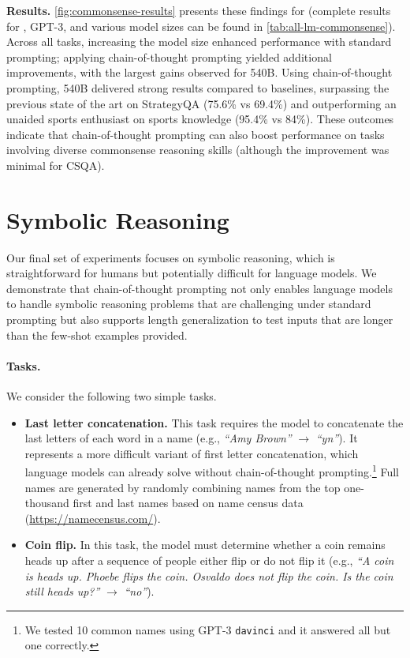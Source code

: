 \textbf{Results.}
\cref{fig:commonsense-results} presents these findings for \palm{} (complete results for \lamda{}, GPT-3, and various model sizes can be found in \cref{tab:all-lm-commonsense}).
Across all tasks, increasing the model size enhanced performance with standard prompting; applying chain-of-thought prompting yielded additional improvements, with the largest gains observed for \palm{} 540B. Using chain-of-thought prompting, \palm{} 540B delivered strong results compared to baselines, surpassing the previous state of the art on StrategyQA (75.6\% vs 69.4\%) and outperforming an unaided sports enthusiast on sports knowledge (95.4\% vs 84\%).
These outcomes indicate that chain-of-thought prompting can also boost performance on tasks involving diverse commonsense reasoning skills (although the improvement was minimal for CSQA).




\section{Symbolic Reasoning}\label{sec:symbolic-reasoning}
Our final set of experiments focuses on symbolic reasoning, which is straightforward for humans but potentially difficult for language models. We demonstrate that chain-of-thought prompting not only enables language models to handle symbolic reasoning problems that are challenging under standard prompting but also supports length generalization to test inputs that are longer than the few-shot examples provided.

\paragraph{Tasks.}
We consider the following two simple tasks.

\begin{itemize}[leftmargin=*,topsep=0pt]
    \itemsep0em \item \textbf{Last letter concatenation.} This task requires the model to concatenate the last letters of each word in a name (e.g., \textit{``Amy Brown''} $\rightarrow$ \textit{``yn''}). 
    It represents a more difficult variant of first letter concatenation, which language models can already solve without chain-of-thought prompting.\footnote{We tested 10 common names using GPT-3 \texttt{davinci} and it answered all but one correctly.} Full names are generated by randomly combining names from the top one-thousand first and last names based on name census data ({\small{\url{https://namecensus.com/}}}).
    \item \textbf{Coin flip.} In this task, the model must determine whether a coin remains heads up after a sequence of people either flip or do not flip it (e.g., \textit{``A coin is heads up. Phoebe flips the coin. Osvaldo does not flip the coin. Is the coin still heads up?''} $\rightarrow$ \textit{``no''}).
\end{itemize}

